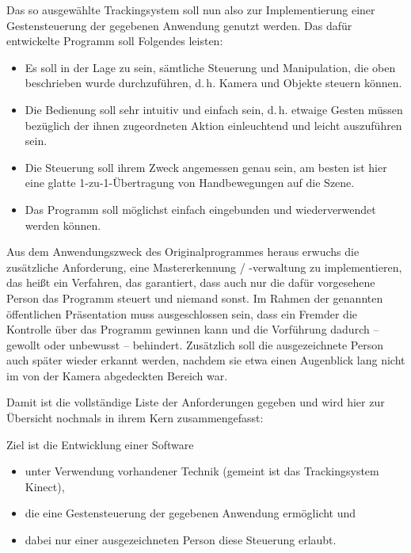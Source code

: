 	Das so ausgewählte Trackingsystem soll nun also zur Implementierung einer Gestensteuerung der gegebenen Anwendung genutzt werden. Das dafür entwickelte Programm soll Folgendes leisten:
	\begin{itemize}
		\item Es soll in der Lage zu sein, sämtliche Steuerung und Manipulation, die oben beschrieben wurde durchzuführen, d.\,h. Kamera und Objekte steuern können.
		\item Die Bedienung soll sehr intuitiv und einfach sein, d.\,h. etwaige Gesten müssen bezüglich der ihnen zugeordneten Aktion einleuchtend und leicht auszuführen sein.
		\item Die Steuerung soll ihrem Zweck angemessen genau sein, am besten ist hier eine glatte 1-zu-1-Übertragung von Handbewegungen auf die Szene.
		\item Das Programm soll möglichst einfach eingebunden und wiederverwendet werden können.		
	\end{itemize}
	Aus dem Anwendungszweck des Originalprogrammes heraus erwuchs die zusätzliche Anforderung, eine Mastererkennung / -verwaltung zu implementieren, das heißt ein Verfahren, das garantiert, dass auch nur die dafür vorgesehene Person das Programm steuert und niemand sonst. Im Rahmen der genannten öffentlichen Präsentation muss ausgeschlossen sein, dass ein Fremder die Kontrolle über das Programm gewinnen kann und die Vorführung dadurch -- gewollt oder unbewusst -- behindert. Zusätzlich soll die ausgezeichnete Person auch später wieder erkannt werden, nachdem sie etwa einen Augenblick lang nicht im von der Kamera abgedeckten Bereich war.\par\bigskip
	Damit ist die vollständige Liste der Anforderungen gegeben und wird hier zur Übersicht nochmals in ihrem Kern zusammengefasst:\par 
	Ziel ist die Entwicklung einer Software
	\begin{itemize}
	\item unter Verwendung vorhandener Technik (gemeint ist das Trackingsystem Kinect),
	\item die eine Gestensteuerung der gegebenen Anwendung ermöglicht und
	\item dabei nur einer ausgezeichneten Person diese Steuerung erlaubt.
	\end{itemize}